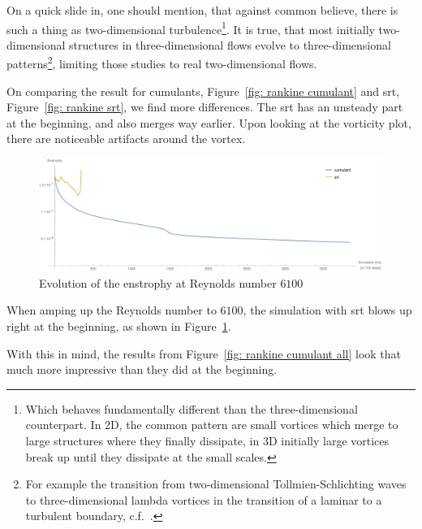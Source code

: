 On a quick slide in, one should mention, that against common believe, there is such a thing as two-dimensional turbulence\footnote{Which behaves fundamentally different than the three-dimensional counterpart. In 2D, the common pattern are small vortices which merge to large structures where they finally dissipate, in 3D initially large vortices break up until they dissipate at the small scales.}.
It is true, that most initially two-dimensional structures in three-dimensional flows evolve to three-dimensional patterns\footnote{For
example the transition from two-dimensional Tollmien-Schlichting waves to  three-dimensional lambda vortices in the transition of a laminar to a turbulent boundary, c.f.~\cite{knörnschild2001untersuchungen}.},
limiting those studies to real two-dimensional flows.

On comparing the result for cumulants, Figure~\ref{fig: rankine cumulant} and \gls{srt}, Figure~\ref{fig: rankine srt}, we find more differences.
The \gls{srt} has an unsteady part at the beginning, and also merges way earlier.
Upon looking at the vorticity plot, there are noticeable artifacts around the vortex.

\begin{figure}
  \centering
  \includegraphics[width=\textwidth]{../figures/vortexMerge_enstrophy6100.pdf}  %
  \caption{Evolution of the enstrophy at Reynolds number $6100$}
\label{fig: rankine 6100}
\end{figure}
When amping up the Reynolds number to $6100$, the simulation with \gls{srt} blows up right at the beginning, as shown in Figure~\ref{fig: rankine 6100}.

With this in mind, the results from Figure~\ref{fig: rankine cumulant all} look that much more impressive than they did at the beginning.

